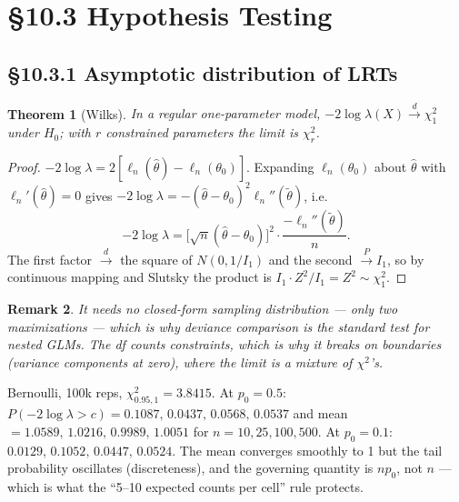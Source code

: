 \documentclass[11pt]{article}
\newtheorem{theorem}{Theorem}[section]
\newtheorem{remark}[theorem]{Remark}
\newcommand{\convP}{\xrightarrow{P}}\newcommand{\convD}{\xrightarrow{d}}
\begin{document}
\section{\S10.3 Hypothesis Testing}
\subsection{\S10.3.1 Asymptotic distribution of LRTs}
\begin{theorem}[Wilks]
In a regular one-parameter model, $-2\log\lambda(X)\convD\chi^2_1$ under $H_0$; with $r$ constrained parameters the limit is $\chi^2_r$.
\end{theorem}
\begin{proof}
$-2\log\lambda=2[\ell_n(\hat\theta)-\ell_n(\theta_0)]$. Expanding $\ell_n(\theta_0)$ about $\hat\theta$ with $\ell_n'(\hat\theta)=0$ gives $-2\log\lambda=-(\hat\theta-\theta_0)^2\ell_n''(\tilde\theta)$, i.e.
\[-2\log\lambda=\big[\sqrt n(\hat\theta-\theta_0)\big]^2\cdot\frac{-\ell_n''(\tilde\theta)}{n}.\]
The first factor $\convD$ the square of $N(0,1/I_1)$ and the second $\convP I_1$, so by continuous mapping and Slutsky the product is $I_1\cdot Z^2/I_1=Z^2\sim\chi^2_1$.
\end{proof}
\begin{remark}
It needs no closed-form sampling distribution --- only two maximizations --- which is why deviance comparison is the standard test for nested GLMs. The df counts constraints, which is why it breaks on boundaries (variance components at zero), where the limit is a mixture of $\chi^2$'s.
\end{remark}
\begin{simbox}
Bernoulli, 100k reps, $\chi^2_{0.95,1}=3.8415$. At $p_0=0.5$: $P(-2\log\lambda>c)=0.1087,\,0.0437,\,0.0568,\,0.0537$ and mean $=1.0589,\,1.0216,\,0.9989,\,1.0051$ for $n=10,25,100,500$. At $p_0=0.1$: $0.0129,\,0.1052,\,0.0447,\,0.0524$. The mean converges smoothly to 1 but the tail probability oscillates (discreteness), and the governing quantity is $np_0$, not $n$ --- which is what the ``5--10 expected counts per cell'' rule protects.
\end{simbox}
\end{document}
